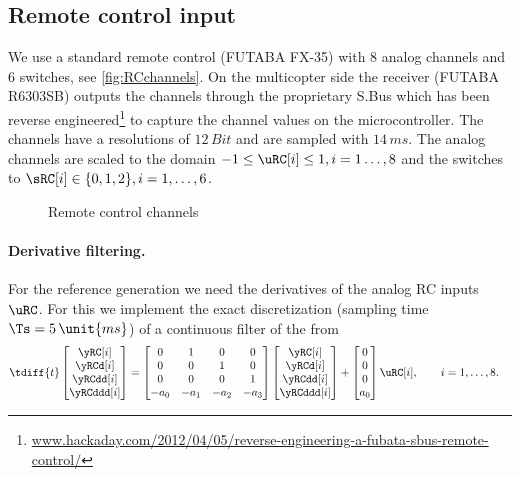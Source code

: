 \subsection{Remote control input}
We use a standard remote control (FUTABA FX-35) with 8 analog channels and 6 switches, see \autoref{fig:RCchannels}.
On the multicopter side the receiver (FUTABA R6303SB) outputs the channels through the proprietary S.Bus which has been reverse engineered\footnote{\url{www.hackaday.com/2012/04/05/reverse-engineering-a-fubata-sbus-remote-control/}} to capture the channel values on the microcontroller.
The channels have a resolutions of $12\,\unit{Bit}$ and are sampled with $14\,\unit{ms}$.
The analog channels are scaled to the domain $-1 \leq \uRC[i] \leq 1, i=1\ldots,8$ and the switches to $\sRC[i] \in \{0,1,2\}, i=1,\ldots,6$.

\begin{figure}[ht]
\centering
 
 \caption{Remote control channels}
 \label{fig:RCchannels}
\end{figure}

\paragraph{Derivative filtering.}
For the reference generation we need the derivatives of the analog RC inputs $\uRC$.
For this we implement the exact discretization (sampling time $\Ts=5\,\unit{ms}$) of a continuous filter of the from
\begin{align}
 \tdiff{t} \begin{bmatrix} \yRC[i] \\ \yRCd[i] \\ \yRCdd[i] \\ \yRCddd[i] \end{bmatrix}
 &= \begin{bmatrix} 0 & 1 & 0 & 0 \\ 0 & 0 & 1 & 0 \\ 0 & 0 & 0 & 1 \\ -a_0 & -a_1 & -a_2 & -a_3 \end{bmatrix}
 \begin{bmatrix} \yRC[i] \\ \yRCd[i] \\ \yRCdd[i] \\ \yRCddd[i] \end{bmatrix}
 + \begin{bmatrix} 0 \\ 0 \\ 0 \\ a_0 \end{bmatrix}
 \uRC[i],
\qquad 
 i = 1,\ldots,8.
\end{align}

